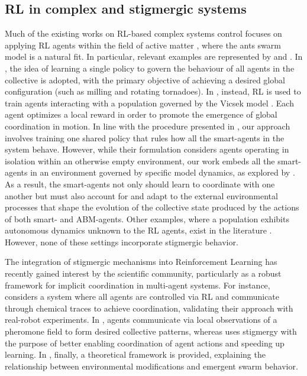 \documentclass[openacc]{rsproca_new}
\begin{document}
\subsection{RL in complex and stigmergic systems}
Much of the existing works on RL-based complex systems control focuses on applying RL agents within the field of active matter \cite{reviewRL4AM}, where the ants swarm model is a natural fit. In particular, relevant examples are represented by \cite{learntotornado} and \cite{learntoflock}.
In \cite{learntotornado}, the idea of learning a single policy to govern the behaviour of all agents in the collective is adopted, with the primary objective of achieving a desired global configuration (such as milling and rotating tornadoes). In \cite{learntoflock}, instead, RL is used to train agents interacting with a population governed by the Vicsek model \cite{vicsek}. Each agent optimizes a local reward in order to promote the emergence of global coordination in motion.
In line with the procedure presented in \cite{learntotornado}, our approach involves training one shared policy that rules how all the smart-agents in the system behave. However, while their formulation considers agents operating in isolation within an otherwise empty environment, our work embeds all the smart-agents in an environment governed by specific model dynamics, as explored by \cite{learntoflock}. As a result, the smart-agents not only should learn to coordinate with one another but must also account for and adapt to the external environmental processes that shape the evolution of the collective state produced by the actions of both smart- and ABM-agents. Other examples, where a population exhibits autonomous dynamics unknown to the RL agents, exist in the literature \cite{coopleader, learntosheep}. However, none of these settings incorporate stigmergic behavior.

The integration of stigmergic mechanisms into Reinforcement Learning has recently gained interest by the scientific community, particularly as a robust framework for implicit coordination in multi-agent systems. For instance, \cite{robotswarm} considers a system where all agents are controlled via RL and communicate through chemical traces to achieve coordination, validating their approach with real-robot experiments. In \cite{indcollaboration}, agents communicate via local observations of a pheromone field to form desired collective patterns, whereas \cite{stigMARL} uses stigmergy with the purpose of better enabling coordination of agent actions and speeding up learning. In \cite{stigmergicmath}, finally, a theoretical framework is provided, explaining the relationship between environmental modifications and emergent swarm behavior. 
\end{document}
